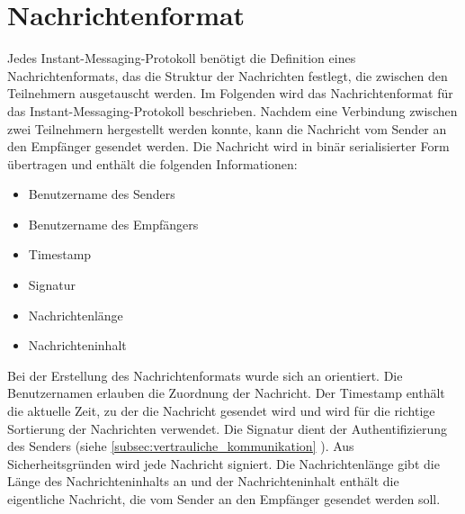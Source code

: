 \section{Nachrichtenformat}
\label{sec:nachrichtenformat}


Jedes Instant-Messaging-Protokoll benötigt die Definition eines Nachrichtenformats, das die Struktur der Nachrichten festlegt, die zwischen den Teilnehmern ausgetauscht werden. Im Folgenden wird das Nachrichtenformat für das Instant-Messaging-Protokoll beschrieben.
Nachdem eine Verbindung zwischen zwei Teilnehmern hergestellt werden konnte, kann die Nachricht vom Sender an den Empfänger gesendet werden. Die Nachricht wird in binär serialisierter Form übertragen und enthält die folgenden Informationen:

\begin{itemize}
    \item Benutzername des Senders
    \item Benutzername des Empfängers
    \item Timestamp
    \item Signatur
    \item Nachrichtenlänge
    \item Nachrichteninhalt
\end{itemize}

\noindent Bei der Erstellung des Nachrichtenformats wurde sich an \cite[S. 9]{rfc2779_IMPP} orientiert. Die Benutzernamen erlauben die Zuordnung der Nachricht. Der Timestamp enthält die aktuelle Zeit, zu der die Nachricht gesendet wird und wird für die richtige Sortierung der Nachrichten verwendet. Die Signatur dient der Authentifizierung des Senders (siehe \ref{subsec:vertrauliche_kommunikation} \textit{}). Aus Sicherheitsgründen wird jede Nachricht signiert. Die Nachrichtenlänge gibt die Länge des Nachrichteninhalts an und der Nachrichteninhalt enthält die eigentliche Nachricht, die vom Sender an den Empfänger gesendet werden soll.
